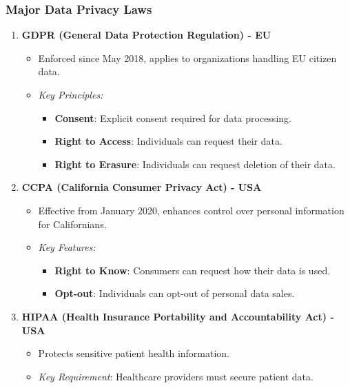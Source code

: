 \documentclass[aspectratio=169]{beamer}
\begin{document}
\begin{frame}[fragile]
    \frametitle{Major Data Privacy Laws}
    \begin{enumerate}
        \item \textbf{GDPR (General Data Protection Regulation) - EU}
        \begin{itemize}
            \item Enforced since May 2018, applies to organizations handling EU citizen data.
            \item \textit{Key Principles:}
            \begin{itemize}
                \item \textbf{Consent}: Explicit consent required for data processing.
                \item \textbf{Right to Access}: Individuals can request their data.
                \item \textbf{Right to Erasure}: Individuals can request deletion of their data.
            \end{itemize}
        \end{itemize}
        
        \item \textbf{CCPA (California Consumer Privacy Act) - USA}
        \begin{itemize}
            \item Effective from January 2020, enhances control over personal information for Californians.
            \item \textit{Key Features:}
            \begin{itemize}
                \item \textbf{Right to Know}: Consumers can request how their data is used.
                \item \textbf{Opt-out}: Individuals can opt-out of personal data sales.
            \end{itemize}
        \end{itemize}
        
        \item \textbf{HIPAA (Health Insurance Portability and Accountability Act) - USA}
        \begin{itemize}
            \item Protects sensitive patient health information.
            \item \textit{Key Requirement}: Healthcare providers must secure patient data.
        \end{itemize}
    \end{enumerate}
\end{frame}
\end{document}
